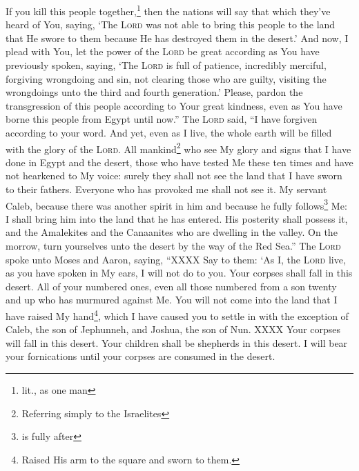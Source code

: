 \begin{enumerate}[align=center]
     If you kill this people together,\footnote{lit., as one man} then the nations will say that which they've heard of You, saying,%
     `The \textsc{Lord} was not able to bring this people to the land that He swore to them because He has destroyed them in the desert.'%
     And now, I plead with You, let the power of the \textsc{Lord} be great according as You have previously spoken, saying,%
     `The \textsc{Lord} is full of patience, incredibly merciful, forgiving wrongdoing and sin, not clearing those who are guilty, visiting the wrongdoings unto the third and fourth generation.'%
     Please, pardon the transgression of this people according to Your great kindness, even as You have borne this people from Egypt until now.''%
     The \textsc{Lord} said, ``I have forgiven according to your word.%
     And yet, even as I live, the whole earth will be filled with the glory of the \textsc{Lord}.%
     All mankind\footnote{Referring simply to the Israelites} who see My glory and signs that I have done in Egypt and the desert, those who have tested Me these ten times and have not hearkened to My voice:%
     surely they shall not see the land that I have sworn to their fathers. Everyone who has provoked me shall not see it.%
     My servant Caleb, because there was another spirit in him and because he fully follows\footnote{is fully after} Me: I shall bring him into the land that he has entered. His posterity shall possess it,%
     and the Amalekites and the Canaanites who are dwelling in the valley. On the morrow, turn yourselves unto the desert by the way of the Red Sea.''%
     The \textsc{Lord} spoke unto Moses and Aaron, saying,%
     ``XXXX%
     Say to them: `As I, the \textsc{Lord} live, as you have spoken in My ears, I will not do to you.%
     Your corpses shall fall in this desert. All of your numbered ones, even all those numbered from a son twenty and up who has murmured against Me.%
     You will not come into the land that I have raised My hand\footnote{Raised His arm to the square and sworn to them.}, which I have caused you to settle in with the exception of Caleb, the son of Jephunneh, and Joshua, the son of Nun.%
     XXXX%
     Your corpses will fall in this desert.%
     Your children shall be shepherds in this desert. I will bear your fornications until your corpses are consumed in the desert.%

\end{enumerate}
